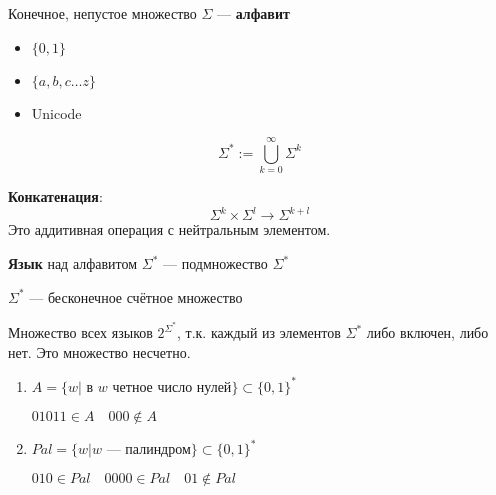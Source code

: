 

\cfoot{}

\usepackage{listings}
\usepackage{courier}
\lstset{basicstyle=\footnotesize\ttfamily,breaklines=true}
\lstset{framextopmargin=50pt,frame=bottomline}



\begin{definition}
    Конечное, непустое множество $\Sigma$ --- \textbf{алфавит}
\end{definition}

\begin{example}
    \begin{itemize}
        \item $\{0, 1\}$
        \item $\{a, b, c\ldots z\}$
        \item Unicode
    \end{itemize}
\end{example}

$$\Sigma^*:=\bigcup_{k=0}^\infty \Sigma^k$$

\begin{definition}
    \textbf{Конкатенация}:
    $$\Sigma^k\times \Sigma^l \to \Sigma^{k+l}$$
    Это аддитивная операция с нейтральным элементом.
\end{definition}

\begin{definition}
    \textbf{Язык} над алфавитом $\Sigma^*$ --- подмножество $\Sigma^*$
\end{definition}

$\Sigma^*$ --- бесконечное счётное множество

Множество всех языков $2^{\Sigma^*}$, т.к. каждый из элементов $\Sigma^*$ либо включен, либо нет. Это множество несчетно.

\begin{example}
    \begin{enumerate}
        \item $A=\{w | \text{ в } w \text{ четное число нулей}\}\subset \{0, 1\}^*$
        
        $01011\in A \quad 000\notin A$
        \item $Pal=\{w | w \text{ --- палиндром}\}\subset \{0, 1\}^*$
        
        $010\in Pal \quad 0000\in Pal \quad 01\notin Pal$
    \end{enumerate}
\end{example}

